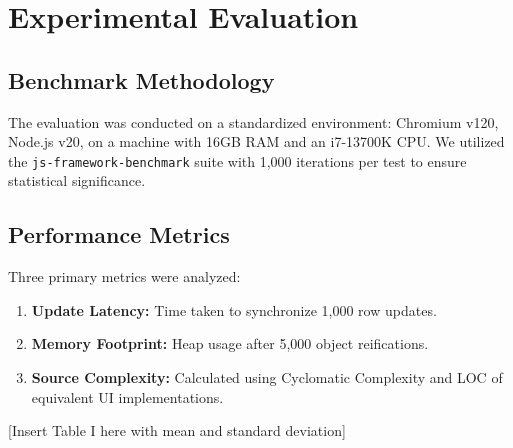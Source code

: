 \section{Experimental Evaluation}

\subsection{Benchmark Methodology}
The evaluation was conducted on a standardized environment: Chromium v120, Node.js v20, on a machine with 16GB RAM and an i7-13700K CPU. We utilized the \texttt{js-framework-benchmark} suite with 1,000 iterations per test to ensure statistical significance.

\subsection{Performance Metrics}
Three primary metrics were analyzed:
\begin{enumerate}
    \item \textbf{Update Latency:} Time taken to synchronize 1,000 row updates.
    \item \textbf{Memory Footprint:} Heap usage after 5,000 object reifications.
    \item \textbf{Source Complexity:} Calculated using Cyclomatic Complexity and LOC of equivalent UI implementations.
\end{enumerate}

[Insert Table I here with mean and standard deviation]